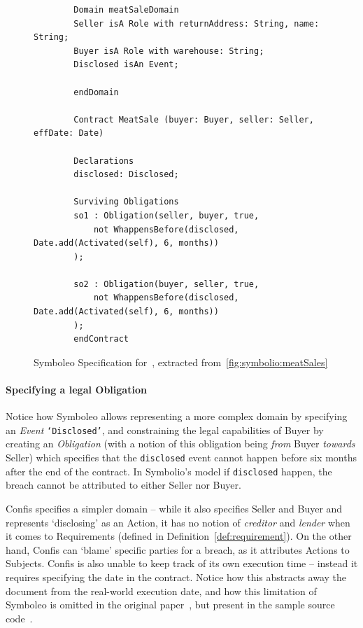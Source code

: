 \begin{figure}[h]
    \begin{verbatim}
        Domain meatSaleDomain
        Seller isA Role with returnAddress: String, name: String;
        Buyer isA Role with warehouse: String;
        Disclosed isAn Event;

        endDomain

        Contract MeatSale (buyer: Buyer, seller: Seller, effDate: Date)

        Declarations
        disclosed: Disclosed;

        Surviving Obligations
        so1 : Obligation(seller, buyer, true,
            not WhappensBefore(disclosed, Date.add(Activated(self), 6, months))
        );

        so2 : Obligation(buyer, seller, true,
            not WhappensBefore(disclosed, Date.add(Activated(self), 6, months))
        );
        endContract

    \end{verbatim}
    \caption{Symboleo Specification for~, extracted from~\autoref{fig:symbolio:meatSales}}
    \label{fig:symbolio:meatSales-confidentiality}
\end{figure}

\paragraph{Specifying a legal Obligation}
Notice how Symboleo allows representing a more complex domain by specifying an \emph{Event} \texttt{`Disclosed'}, and constraining the legal capabilities of Buyer by creating an \emph{Obligation} (with a notion of this obligation being \emph{from} Buyer \emph{towards} Seller) which specifies that the \texttt{disclosed} event cannot happen before six months after the end of the contract.
In Symbolio's model if \texttt{disclosed} happen, the breach cannot be attributed to either Seller nor Buyer.

Confis specifies a simpler domain -- while it also specifies Seller and Buyer and represents `disclosing' as an Action, it has no notion of \emph{creditor} and \emph{lender} when it comes to Requirements (defined in Definition~\autoref{def:requirement}).
On the other hand, Confis can `blame' specific parties for a breach, as it attributes Actions to Subjects.
Confis is also unable to keep track of its own execution time -- instead it requires specifying the date in the contract.
Notice how this abstracts away the document from the real-world execution date, and how this limitation of Symboleo is omitted in the original paper~\cite{symboleo2020}, but present in the sample source code~\cite{symboleoMeat}.


